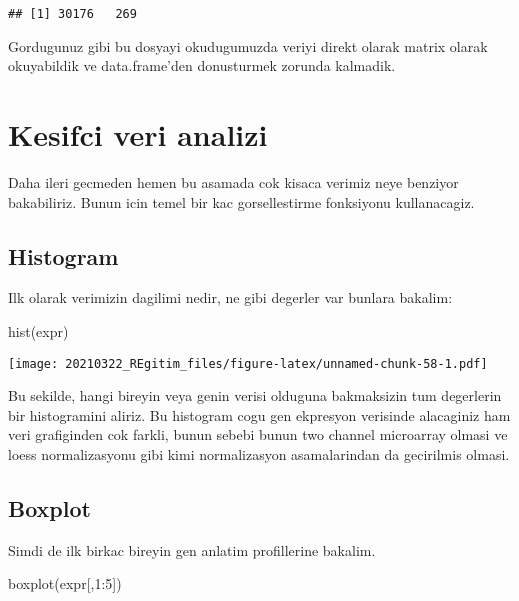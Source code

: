 \documentclass[
]{book}
\newenvironment{Shaded}{\begin{snugshade}}{\end{snugshade}}
\newcommand{\DecValTok}[1]{\textcolor[rgb]{0.00,0.00,0.81}{#1}}
\newcommand{\FunctionTok}[1]{\textcolor[rgb]{0.00,0.00,0.00}{#1}}
\newcommand{\NormalTok}[1]{#1}
\newcommand{\SpecialCharTok}[1]{\textcolor[rgb]{0.00,0.00,0.00}{#1}}
\begin{document}
\begin{verbatim}
## [1] 30176   269
\end{verbatim}

Gordugunuz gibi bu dosyayi okudugumuzda veriyi direkt olarak matrix olarak okuyabildik ve data.frame'den donusturmek zorunda kalmadik.

\hypertarget{kesifci-veri-analizi}{%
\section{Kesifci veri analizi}\label{kesifci-veri-analizi}}

Daha ileri gecmeden hemen bu asamada cok kisaca verimiz neye benziyor bakabiliriz. Bunun icin temel bir kac gorsellestirme fonksiyonu kullanacagiz.

\hypertarget{histogram}{%
\subsection{Histogram}\label{histogram}}

Ilk olarak verimizin dagilimi nedir, ne gibi degerler var bunlara bakalim:

\begin{Shaded}
\begin{Highlighting}[]
\FunctionTok{hist}\NormalTok{(expr)}
\end{Highlighting}
\end{Shaded}

\texttt{[image: 20210322\_REgitim\_files/figure-latex/unnamed-chunk-58-1.pdf]}

Bu sekilde, hangi bireyin veya genin verisi olduguna bakmaksizin tum degerlerin bir histogramini aliriz. Bu histogram cogu gen ekpresyon verisinde alacaginiz ham veri grafiginden cok farkli, bunun sebebi bunun two channel microarray olmasi ve loess normalizasyonu gibi kimi normalizasyon asamalarindan da gecirilmis olmasi.

\hypertarget{boxplot}{%
\subsection{Boxplot}\label{boxplot}}

Simdi de ilk birkac bireyin gen anlatim profillerine bakalim.

\begin{Shaded}
\begin{Highlighting}[]
\FunctionTok{boxplot}\NormalTok{(expr[,}\DecValTok{1}\SpecialCharTok{:}\DecValTok{5}\NormalTok{])}
\end{Highlighting}
\end{Shaded}
\end{document}
